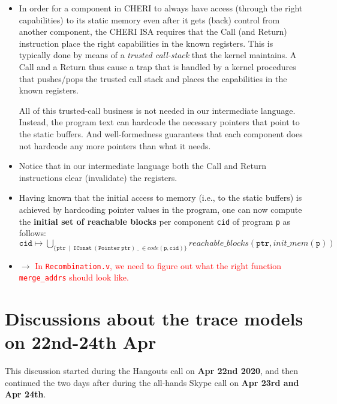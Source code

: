 \documentclass[12pt,a4paper]{article}
\newcommand{\todo}[1]{$\rightarrow$ \textcolor{red}{#1}}
\begin{document}
\begin{itemize}
\item In order for a component in CHERI to always have access
(through the right capabilities) to its
static memory even after it gets (back) control from another 
component, the CHERI ISA 
requires that the Call (and Return) instruction
place the right capabilities in the known registers.
This is typically done by means of a \textit{trusted call-stack}
that the kernel maintains. A Call and a Return thus cause a trap
that is handled by a kernel procedures that pushes/pops the
trusted call stack and places the capabilities in the known
registers.

All of this trusted-call business is not needed in our intermediate
language. Instead, the program text can hardcode the necessary
pointers that point to the static buffers.
And well-formedness guarantees that each component does not
hardcode any more pointers than what it needs.

\item Notice that in our intermediate language
both the Call and Return instructions
clear (invalidate) the registers.

\item Having known that the initial access to memory (i.e., to
the static buffers) is achieved by hardcoding pointer
values in the program, one can now compute the \textbf{initial
set of reachable blocks} per component \texttt{cid}
of program \texttt{p} as follows:\\
$\mathtt{cid} \mapsto \underset{\{\mathtt{ptr}
	 ~\mid~ \mathtt{IConst ~(Pointer ~ptr)~ \_}~ \in
	 \mathit{code}(\texttt{p}, \texttt{cid}) \}}{\bigcup} 
 \mathit{reachable\_blocks}
 (\texttt{ptr}, \mathit{init\_mem}(\texttt{p}))
$

\item \todo{In \texttt{Recombination.v}, we need to figure out
what the right function \texttt{merge\_addrs} should look like.}


\end{itemize}

\section{Discussions about the trace models on 22nd-24th Apr}

This discussion started during the Hangouts call on 
\textbf{Apr 22nd 2020},
and then continued the two days after during the all-hands Skype call
on \textbf{Apr 23rd and Apr 24th}.
\end{document}
